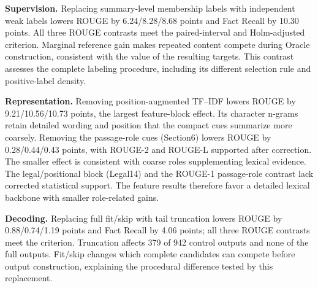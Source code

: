 \documentclass[10pt,twocolumn,letterpaper]{article}
\begin{document}
\textbf{Supervision.} Replacing summary-level membership labels with independent weak labels lowers ROUGE by 6.24/8.28/8.68 points and Fact Recall by 10.30 points. All three ROUGE contrasts meet the paired-interval and Holm-adjusted criterion. Marginal reference gain makes repeated content compete during Oracle construction, consistent with the value of the resulting targets. This contrast assesses the complete labeling procedure, including its different selection rule and positive-label density.

\textbf{Representation.} Removing position-augmented TF--IDF lowers ROUGE by 9.21/10.56/10.73 points, the largest feature-block effect. Its character n-grams retain detailed wording and position that the compact cues summarize more coarsely. Removing the passage-role cues (Section6) lowers ROUGE by 0.28/0.44/0.43 points, with ROUGE-2 and ROUGE-L supported after correction. The smaller effect is consistent with coarse roles supplementing lexical evidence. The legal/positional block (Legal14) and the ROUGE-1 passage-role contrast lack corrected statistical support. The feature results therefore favor a detailed lexical backbone with smaller role-related gains.

\textbf{Decoding.} Replacing full fit/skip with tail truncation lowers ROUGE by 0.88/0.74/1.19 points and Fact Recall by 4.06 points; all three ROUGE contrasts meet the criterion. Truncation affects 379 of 942 control outputs and none of the full outputs. Fit/skip changes which complete candidates can compete before output construction, explaining the procedural difference tested by this replacement.
\end{document}
